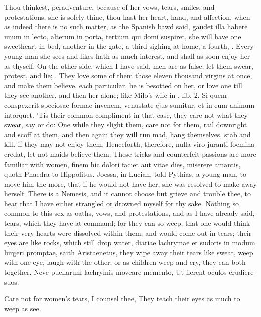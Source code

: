 Thou thinkest, peradventure, because of her vows, tears, smiles, and
protestations, she is solely thine, thou hast her heart, hand, and
affection, when as indeed there is no such matter, as the Spanish
bawd said, gaudet illa habere unum in lecto, alterum in porta, tertium
qui domi suspiret, she will have one sweetheart in bed, another in the
gate, a third sighing at home, a fourth, \etc{}. Every young man she sees
and likes hath as much interest, and shall as soon enjoy her as
thyself. On the other side, which I have said, men are as false, let
them swear, protest, and lie; . They love some of them those eleven thousand virgins at once,
and make them believe, each particular, he is besotted on her, or love
one till they see another, and then her alone; like Milo's wife in
\Apuleius, lib. 2. Si quem conspexerit speciosae formae invenem,
venustate ejus sumitur, et in eum animum intorquet. 'Tis their common
compliment in that case, they care not what they swear, say or do: One
while they slight them, care not for them, rail downright and scoff at
them, and then again they will run mad, hang themselves, stab and kill,
if they may not enjoy them. Henceforth, therefore,-nulla viro juranti
foemina credat, let not maids believe them. These tricks and
counterfeit passions are more familiar with women, finem hic
dolori faciet aut vitae dies, miserere amantis, quoth Phaedra to
Hippolitus. Joessa, in Lucian, told Pythias, a young man, to move
him the more, that if he would not have her, she was resolved to make
away herself. There is a Nemesis, and it cannot choose but grieve and
trouble thee, to hear that I have either strangled or drowned myself
for thy sake. Nothing so common to this sex as oaths, vows, and
protestations, and as I have already said, tears, which they have at
command; for they can so weep, that one would think their very hearts
were dissolved within them, and would come out in tears; their eyes are
like rocks, which still drop water, diariae lachrymae et sudoris in
modum lurgeri promptae, saith  Aristaenetus, they wipe away their
tears like sweat, weep with one eye, laugh with the other; or as
children weep and cry, they can both together.
Neve puellarum lachrymis moveare memento,
Ut flerent oculos erudiere suos.

Care not for women's tears, I counsel thee,
They teach their eyes as much to weep as see.

